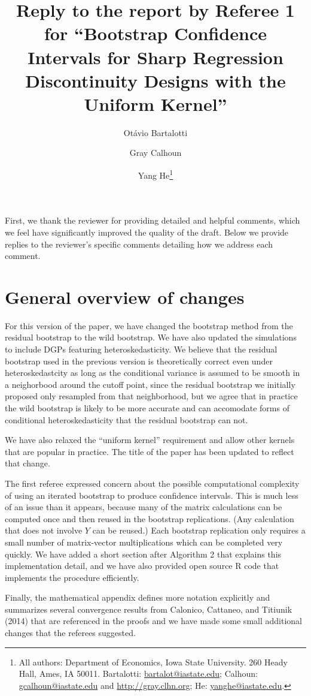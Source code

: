 \documentclass[12pt,fleqn]{article}
\title{Reply to the report by Referee 1 for ``Bootstrap Confidence Intervals for Sharp Regression Discontinuity Designs
  with the Uniform Kernel''}
\author{Ot\'avio Bartalotti \and Gray Calhoun \and Yang He\thanks{%
  All authors: Department of Economics, Iowa State University.
  260 Heady Hall, Ames, IA 50011.
  Bartalotti: \protect\url{bartalot@iastate.edu};
  Calhoun: \protect\url{gcalhoun@iastate.edu} and
  \protect\url{http://gray.clhn.org};
  He: \protect\url{yanghe@iastate.edu}.}}
\begin{document}
\maketitle

First, we thank the reviewer for providing detailed and helpful comments, which
we feel have significantly improved the quality of the draft.  Below we provide
replies to the reviewer's specific comments detailing how we address each
comment.

\section{General overview of changes}

For this version of the paper, we have changed the bootstrap method from the
residual bootstrap to the wild bootstrap. We have also updated the simulations
to include DGPs featuring heteroskedasticity. We believe that the residual
bootstrap used in the previous version is theoretically correct even under
heteroskedastcity as long as the conditional variance is assumed to be smooth in
a neighorbood around the cutoff point, since the residual bootstrap we initially
proposed only resampled from that neighborhood, but we agree that in practice
the wild bootstrap is likely to be more accurate and can accomodate forms of
conditional heteroskedasticity that the residual bootstrap can not.

We have also relaxed the ``uniform kernel'' requirement and allow other kernels
that are popular in practice. The title of the paper has been updated to reflect
that change.

The first referee expressed concern about the possible computational complexity of
using an iterated bootstrap to produce confidence intervals. This is much less
of an issue than it appears, because many of the matrix calculations can be
computed once and then reused in the bootstrap replications. (Any calculation
that does not involve $Y$ can be reused.) Each bootstrap replication only
requires a small number of matrix-vector multiplications which can be completed
very quickly. We have added a short section after Algorithm 2 that explains
this implementation detail, and we have also provided open source R code that
implements the procedure efficiently.

Finally, the mathematical appendix defines more notation explicitly and
summarizes several convergence results from Calonico, Cattaneo, and Titiunik
(2014) that are referenced in the proofs and we have made some small additional
changes that the referees suggested.
\end{document}
